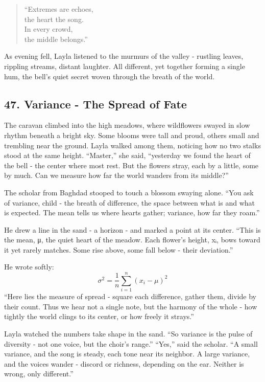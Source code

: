 \documentclass[
  letterpaper,
  DIV=11,
  numbers=noendperiod]{scrreprt}
\begin{document}
\begin{quote}
``Extremes are echoes,\\
the heart the song.\\
In every crowd,\\
the middle belongs.''
\end{quote}

As evening fell, Layla listened to the murmurs of the valley - rustling
leaves, rippling streams, distant laughter. All different, yet together
forming a single hum, the bell's quiet secret woven through the breath
of the world.

\subsection{47. Variance - The Spread of
Fate}\label{variance---the-spread-of-fate}

The caravan climbed into the high meadows, where wildflowers swayed in
slow rhythm beneath a bright sky. Some blooms were tall and proud,
others small and trembling near the ground. Layla walked among them,
noticing how no two stalks stood at the same height. ``Master,'' she
said, ``yesterday we found the heart of the bell - the center where most
rest. But the flowers stray, each by a little, some by much. Can we
measure how far the world wanders from its middle?''

The scholar from Baghdad stooped to touch a blossom swaying alone. ``You
ask of variance, child - the breath of difference, the space between
what is and what is expected. The mean tells us where hearts gather;
variance, how far they roam.''

He drew a line in the sand - a horizon - and marked a point at its
center. ``This is the mean, μ, the quiet heart of the meadow. Each
flower's height, xᵢ, bows toward it yet rarely matches. Some rise above,
some fall below - their deviation.''

He wrote softly: \[
σ^2 = \frac{1}{n} \sum_{i=1}^n (x_i - μ)^2
\] ``Here lies the measure of spread - square each difference, gather
them, divide by their count. Thus we hear not a single note, but the
harmony of the whole - how tightly the world clings to its center, or
how freely it strays.''

Layla watched the numbers take shape in the sand. ``So variance is the
pulse of diversity - not one voice, but the choir's range.'' ``Yes,''
said the scholar. ``A small variance, and the song is steady, each tone
near its neighbor. A large variance, and the voices wander - discord or
richness, depending on the ear. Neither is wrong, only different.''
\end{document}
